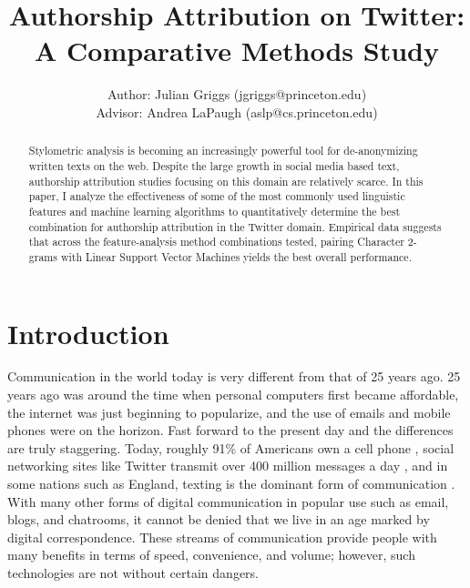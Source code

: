 \documentclass[pageno]{jpaper}
\begin{document}
\title{Authorship Attribution on Twitter: A Comparative Methods Study}
\author{Author: Julian Griggs (jgriggs@princeton.edu) \\ Advisor: Andrea LaPaugh (aslp@cs.princeton.edu)}
\date{}
\maketitle

\thispagestyle{empty}

\begin{abstract}
\label{sec:abstract}
Stylometric analysis is becoming an increasingly powerful tool for de-anonymizing written texts on the web.     Despite the large growth in social media based text, authorship attribution studies focusing on this domain are relatively scarce.  In this paper, I analyze the effectiveness of some of the most commonly used linguistic features and machine learning algorithms to quantitatively determine the best combination for authorship attribution in the Twitter domain.  Empirical data suggests that across the feature-analysis method combinations tested, pairing Character 2-grams with Linear Support Vector Machines yields the best overall performance.
\end{abstract}

\section{Introduction}
\label{sec:intro}
Communication in the world today is very different from that of 25 years ago.  25 years ago was around the time when personal computers first became affordable, the internet was just beginning to popularize, and the use of emails and mobile phones were on the horizon.  Fast forward to the present day and the differences are truly staggering.  Today, roughly 91\% of Americans own a cell phone \cite{cellphone-ownership},  social networking sites like Twitter transmit over 400 million messages a day \cite{twitterTurns7}, and in some nations such as England, texting is the dominant form of communication \cite{textingFreq}.  With many other forms of digital communication in popular use such as email, blogs, and chatrooms, it cannot be denied that we live in an age marked by digital correspondence.  These streams of communication provide people with many benefits in terms of speed, convenience, and volume; however, such technologies are not without certain dangers.
\end{document}
